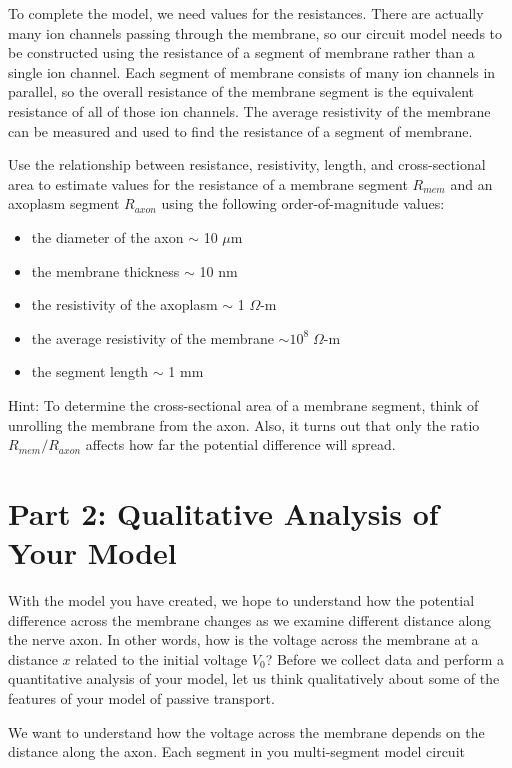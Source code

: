 \par 
To complete the model, we need values for the resistances.
There are actually many ion channels passing through the membrane, so our circuit model needs to be constructed using the resistance of a segment of membrane rather  than a single ion channel.
Each segment of membrane consists of many ion channels in parallel, so the overall resistance of the membrane segment is the equivalent resistance of all of those ion channels. 
The average resistivity of the membrane can be measured and used to find the resistance of a segment of membrane.
\par 
Use the relationship between resistance, resistivity, length, and cross-sectional area to estimate values for the resistance of a membrane segment $R_{mem}$ and an axoplasm segment $R_{axon}$ using the following order-of-magnitude values:
\begin{itemize}
\item the diameter of the axon $\sim$ 10 $\mu$m
\item the membrane thickness $\sim$ 10 nm
\item the resistivity of the axoplasm $\sim$ 1 $\Omega$-m
\item the average resistivity of the membrane $\sim  10^{8} \; \Omega$-m
\item the segment length $\sim$ 1 mm
\end{itemize}
Hint: To determine the cross-sectional area of a membrane segment, think of unrolling the membrane from the axon.
Also, it turns out that only the ratio $R_{mem}/R_{axon}$ affects how far the potential difference will spread.

\section*{Part 2: Qualitative Analysis of Your Model}
With the model you have created, we hope to understand how the potential difference across the membrane changes as we examine different distance along the nerve axon.
In other words, how is the voltage across the membrane at a distance $x$ related to the initial voltage $V_{0}$?
Before we collect data and perform a quantitative analysis of your model, let us think qualitatively about some of the features of your model of passive transport.
\par 
We want to understand how the voltage across the membrane depends on the distance along the axon.
Each segment in you multi-segment model circuit 